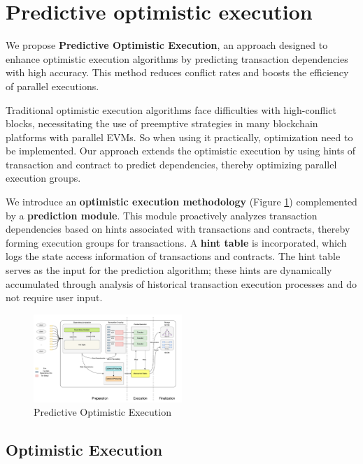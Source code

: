 
\section{Predictive optimistic execution}

We propose \textbf{Predictive Optimistic Execution}, an approach designed to enhance optimistic execution algorithms by predicting transaction dependencies with high accuracy. This method reduces conflict rates and boosts the efficiency of parallel executions.

Traditional optimistic execution algorithms face difficulties with high-conflict blocks, necessitating the use of preemptive strategies in many blockchain platforms with parallel EVMs. So when using it practically, optimization need to be implemented. Our approach extends the optimistic execution by using hints of transaction and contract to predict dependencies, thereby optimizing parallel execution groups.

We introduce an \textbf{optimistic execution methodology} (Figure \ref{fig:predictive_optimistic_execution}) complemented by a \textbf{prediction module}. This module proactively analyzes transaction dependencies based on hints associated with transactions and contracts, thereby forming execution groups for transactions. A \textbf{hint table} is incorporated, which logs the state access information of transactions and contracts. The hint table serves as the input for the prediction algorithm; these hints are dynamically accumulated through analysis of historical transaction execution processes and do not require user input.

\begin{figure}[htp]
\centering
\includegraphics[width=0.5\textwidth]{sections/images/predictive-optimistic-execution.png}
\caption{Predictive Optimistic Execution}
\label{fig:predictive_optimistic_execution}
\end{figure}

\subsection{Optimistic Execution}

